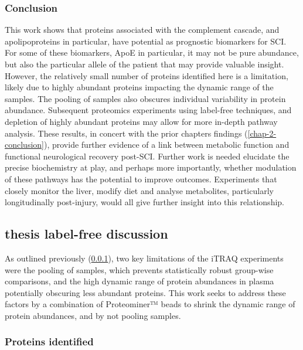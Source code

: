 \documentclass[
]{article}
\begin{document}
\hypertarget{chap-3-conc}{%
\subsubsection{Conclusion}\label{chap-3-conc}}

This work shows that proteins associated with the complement cascade, and apolipoproteins in particular, have potential as prognostic biomarkers for SCI.
For some of these biomarkers, ApoE in particular, it may not be pure abundance, but also the particular allele of the patient that may provide valuable insight.
However, the relatively small number of proteins identified here is a limitation, likely due to highly abundant proteins impacting the dynamic range of the samples.
The pooling of samples also obscures individual variability in protein abundance.
Subsequent proteomics experiments using label-free techniques, and depletion of highly abundant proteins may allow for more in-depth pathway analysis.
These results, in concert with the prior chapters findings (\ref{chap-2-conclusion}), provide further evidence of a link between metabolic function and functional neurological recovery post-SCI.
Further work is needed elucidate the precise biochemistry at play, and perhaps more importantly, whether modulation of these pathways has the potential to improve outcomes.
Experiments that closely monitor the liver, modify diet and analyse metabolites, particularly longitudinally post-injury, would all give further insight into this relationship.

\hypertarget{thesis-label-free-discussion}{%
\subsection{thesis label-free discussion}\label{thesis-label-free-discussion}}

As outlined previously (\ref{chap-3-conc}), two key limitations of the iTRAQ experiments were the pooling of samples, which prevents statistically robust group-wise comparisons, and the high dynamic range of protein abundances in plasma potentially obscuring less abundant proteins.
This work seeks to address these factors by a combination of Proteominer™ beads to shrink the dynamic range of protein abundances, and by not pooling samples.

\hypertarget{proteins-identified-1}{%
\subsubsection{Proteins identified}\label{proteins-identified-1}}
\end{document}
